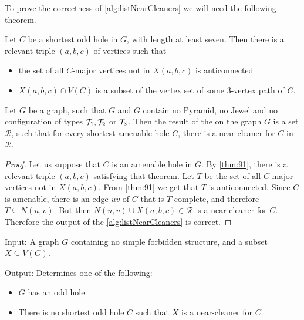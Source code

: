 To prove the correctness of \cref{alg:listNearCleaners} we will need the following theorem.

\begin{theorem}[9.1 of \cite{MC05}]
	\label{thm:91}
	Let $C$ be a shortest odd hole in $G$, with length at least seven. Then there is a relevant triple $(a, b, c)$ of vertices such that
	\begin{itemize}
		\item the set of all $C$-major vertices not in $X(a, b, c)$ is anticonnected
		\item $X(a, b, c) \cap V(C)$ is a subset of the vertex set of some 3-vertex path of $C$.
	\end{itemize}
\end{theorem}

\begin{theorem}
	Let $G$ be a graph, such that $G$ and $\overline{G}$ contain no Pyramid, no Jewel and no configuration of types $\mathcal{T}_1, \mathcal{T}_2$ or $\mathcal{T}_3$. Then the result of the  on the graph $G$ is a set $\mathcal{R}$, such that for every shortest amenable hole $C$, there is a near-cleaner for $C$ in $\mathcal{R}$.
\end{theorem}
\begin{proof}
	Let us suppose that $C$ is an amenable hole in $G$. By \cref{thm:91}, there is a relevant triple $(a, b, c)$ satisfying that theorem. Let $T$ be the set of all $C$-major vertices not in $X(a,b,c)$. From \cref{thm:91} we get that $T$ is anticonnected. Since $C$ is amenable, there is an edge $uv$ of $C$ that is $T$-complete, and therefore $T \subseteq N(u, v)$. But then $N(u, v) \cup X(a, b, c) \in \mathcal{R}$ is a near-cleaner for $C$. Therefore the output of the \cref{alg:listNearCleaners} is correct.
\end{proof}

\begin{alg}
	\label{alg:testNearCleaner}
	Input: A graph $G$ containing no simple forbidden structure, and a subset $X \subseteq V(G)$.

	\noindent Output: Determines one of the following:
	\begin{itemize}
		\item $G$ has an odd hole
		\item There is no shortest odd hole $C$ such that $X$ is a near-cleaner for $C$.
	\end{itemize}
\end{alg}

